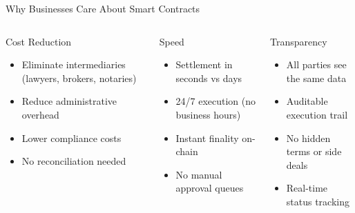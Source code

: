 \documentclass[8pt,aspectratio=169]{beamer}
\begin{document}
\begin{frame}{Why Businesses Care About Smart Contracts}
\begin{columns}[T]
\begin{block}{\textcolor{mlblue}{Cost Reduction}}
\footnotesize
\begin{itemize}
  \item Eliminate intermediaries (lawyers, brokers, notaries)
  \item Reduce administrative overhead
  \item Lower compliance costs
  \item No reconciliation needed
\end{itemize}
\end{block}

\begin{block}{\textcolor{mlgreen}{Speed}}
\footnotesize
\begin{itemize}
  \item Settlement in seconds vs days
  \item 24/7 execution (no business hours)
  \item Instant finality on-chain
  \item No manual approval queues
\end{itemize}
\end{block}

\begin{block}{\textcolor{mlorange}{Transparency}}
\footnotesize
\begin{itemize}
  \item All parties see the same data
  \item Auditable execution trail
  \item No hidden terms or side deals
  \item Real-time status tracking
\end{itemize}
\end{block}


\end{columns}
\end{frame}
\end{document}
